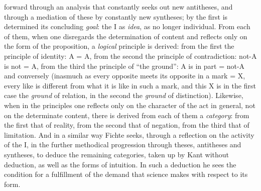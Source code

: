 forward through an analysis that constantly seeks out new antitheses,
and through a mediation of these by constantly new syntheses; by the
first is determined its concluding \emph{goal}: the I as \emph{idea},
as no longer individual. From each of them, when one disregards the
determination of content and reflects only on the form of the
proposition, a \emph{logical} principle is derived: from the first the
principle of identity: A = A, from the second the principle of
contradiction: not-A is not = A, from the third the principle of ``the
ground'': A is in part = not-A and conversely (inasmuch as every
opposite meets its opposite in a mark = X, every like is different from
what it is like in such a mark, and this X is in the first case the
\emph{ground} of relation, in the second the \emph{ground} of
distinction). Likewise, when in the principles one reflects only on the
character of the act in general, not on the determinate content, there
is derived from each of them a \emph{category}: from the first that of
reality, from the second that of negation, from the third that of
limitation. And in a similar way Fichte seeks, through a
reflection on the activity of the I, in the further methodical
progression through theses, antitheses and syntheses, to deduce the
remaining categories, taken up by Kant without deduction, as well as
the forms of intuition. In such a deduction he sees the condition for a
fulfillment of the demand that science makes with respect to its form.

